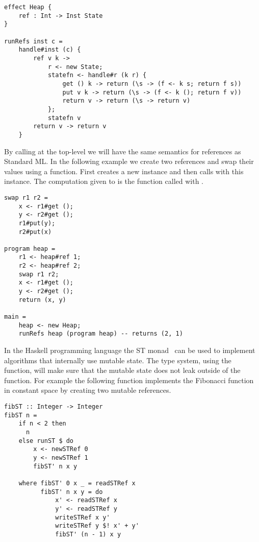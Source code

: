\begin{verbatim}
effect Heap {
	ref : Int -> Inst State
}

runRefs inst c =
	handle#inst (c) {
		ref v k ->
			r <- new State;
			statefn <- handle#r (k r) {
				get () k -> return (\s -> (f <- k s; return f s))
				put v k -> return (\s -> (f <- k (); return f v))
				return v -> return (\s -> return v)
			};
			statefn v 
		return v -> return v
	}
\end{verbatim}

By calling  at the top-level we will have the same semantics for references as Standard ML.
In the following example we create two references and swap their values using a  function.
First  creates a new  instance  and then calls  with this instance.
The computation given to  is the function  called with .

\pagebreak
\begin{verbatim}
swap r1 r2 =
	x <- r1#get ();
	y <- r2#get ();
	r1#put(y);
	r2#put(x)
	
program heap =
	r1 <- heap#ref 1;
	r2 <- heap#ref 2;
	swap r1 r2;
	x <- r1#get ();
	y <- r2#get ();
	return (x, y)
	
main =
	heap <- new Heap;
	runRefs heap (program heap) -- returns (2, 1)
\end{verbatim}

In the Haskell programming language the ST monad~\autocite{runst} can be used to implement algorithms that internally use mutable state.
The type system, using the  function, will make sure that the mutable state does not leak outside of the function.
For example the following function  implements the Fibonacci function in constant space by creating two mutable references.

\begin{verbatim}
fibST :: Integer -> Integer
fibST n = 
    if n < 2 then
      n
    else runST $ do
        x <- newSTRef 0
        y <- newSTRef 1
        fibST' n x y

    where fibST' 0 x _ = readSTRef x
          fibST' n x y = do
              x' <- readSTRef x
              y' <- readSTRef y
              writeSTRef x y'
              writeSTRef y $! x' + y'
              fibST' (n - 1) x y
\end{verbatim}

